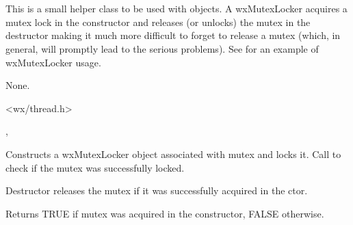 \section{}\label{wxmutexlocker}

This is a small helper class to be used with  
objects. A wxMutexLocker acquires a mutex lock in the constructor and releases
(or unlocks) the mutex in the destructor making it much more difficult to
forget to release a mutex (which, in general, will promptly lead to the serious
problems). See  for an example of wxMutexLocker
usage.


None.


<wx/thread.h>


, 


\label{wxmutexlockerctor}


Constructs a wxMutexLocker object associated with mutex and locks it.
Call  to check if the mutex was
successfully locked.

\label{wxmutexlockerdtor}


Destructor releases the mutex if it was successfully acquired in the ctor.

\label{wxmutexlockerisok}


Returns TRUE if mutex was acquired in the constructor, FALSE otherwise.

